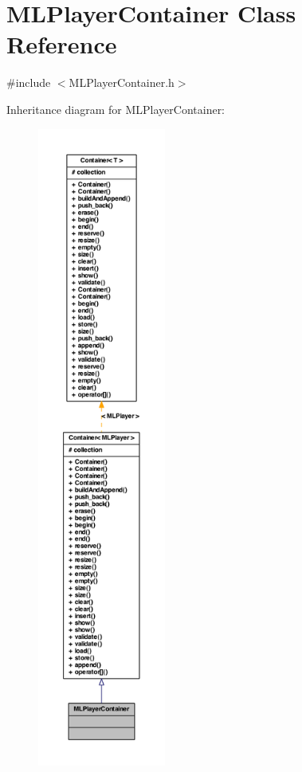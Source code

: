 \hypertarget{class_m_l_player_container}{
\section{MLPlayerContainer Class Reference}
\label{class_m_l_player_container}
}


{\ttfamily \#include $<$MLPlayerContainer.h$>$}



Inheritance diagram for MLPlayerContainer:
\nopagebreak
\begin{figure}[H]
\begin{center}
\leavevmode
\includegraphics[height=600pt]{class_m_l_player_container__inherit__graph}
\end{center}
\end{figure}


